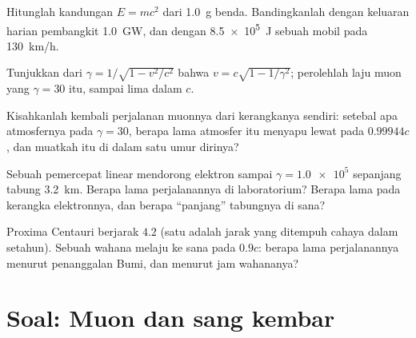 \begin{exercise}[$\star\star$]\label{exo:g12:special-relativity:11}
Hitunglah kandungan  $E = mc^2$ dari \qty{1.0}{g} benda. Bandingkanlah
dengan keluaran harian pembangkit \qty{1.0}{GW}, dan dengan
 \qty{8.5e5}{J} sebuah mobil pada \qty{130}{km/h}.
\end{exercise}

\begin{exercise}[$\star\star\star$]\label{exo:g12:special-relativity:12}
Tunjukkan dari $\gamma = 1/\sqrt{1 - v^2/c^2}$ bahwa $v = c\sqrt{1 - 1/\gamma^2}$;
perolehlah laju muon yang $\gamma = 30$ itu, sampai lima  dalam
 $c$.
\end{exercise}

\begin{exercise}[$\star\star\star$]\label{exo:g12:special-relativity:13}
Kisahkanlah kembali perjalanan muonnya dari kerangkanya sendiri: setebal apa atmosfernya
pada $\gamma = 30$, berapa lama atmosfer itu menyapu lewat pada $0.99944c$, dan muatkah itu
di dalam satu umur dirinya?
\end{exercise}

\begin{exercise}[$\star\star\star$]\label{exo:g12:special-relativity:14}
Sebuah pemercepat linear mendorong elektron sampai $\gamma = \num{1.0e5}$ sepanjang
tabung \qty{3.2}{km}. Berapa lama perjalanannya di laboratorium? Berapa lama pada
kerangka elektronnya, dan berapa ``panjang'' tabungnya di sana?
\end{exercise}

\begin{exercise}[$\star\star\star$]\label{exo:g12:special-relativity:15}
Proxima Centauri berjarak $4.2$  (satu  adalah jarak
yang ditempuh cahaya dalam setahun). Sebuah wahana melaju ke sana pada $0.9c$: berapa lama
perjalanannya menurut penanggalan Bumi, dan menurut jam wahananya?
\end{exercise}

\section{Soal: Muon dan sang kembar}

